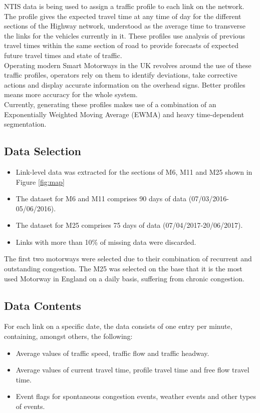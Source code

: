 \documentclass[conference]{IEEEtran}
\begin{document}
NTIS data is being used to assign a traffic profile to each link on the network. The profile gives the expected travel time at any time of day for the different sections of the Highway network, understood as the average time to transverse the links for the vehicles currently in it. These profiles use analysis of previous travel times within the same section of road to provide forecasts of expected future travel times and state of traffic.\\

Operating modern Smart Motorways in the UK revolves around the use of these traffic profiles, operators rely on them to identify deviations, take corrective actions and display accurate information on the overhead signs. Better profiles means more accuracy for the whole system.\\

Currently, generating these profiles makes use of a combination of an Exponentially Weighted Moving Average (EWMA) and heavy time-dependent segmentation. 


\subsection{Data Selection}
\begin{itemize}
	\item Link-level data was extracted for the sections of M6, M11 and M25 shown in Figure \ref{fig:map}
	\item The dataset for M6 and M11 comprises 90 days of data (07/03/2016-05/06/2016).
	\item The dataset for M25 comprises 75 days of data (07/04/2017-20/06/2017).
	\item Links with more than 10\% of missing data were discarded.
\end{itemize}
The first two motorways were selected due to their combination of recurrent and outstanding congestion. The M25 was selected on the base that it is the most used Motorway in England on a daily basis, suffering from chronic congestion.
\subsection{Data Contents}
For each link on a specific date, the data consists of one entry per minute, containing, amongst others, the following:
\begin{itemize}
	\item Average values of traffic speed, traffic flow and traffic headway.
	\item Average values of current travel time, profile travel time and free flow travel time.
	\item Event flags for spontaneous congestion events, weather events and other types of events.	
\end{itemize}
\end{document}
